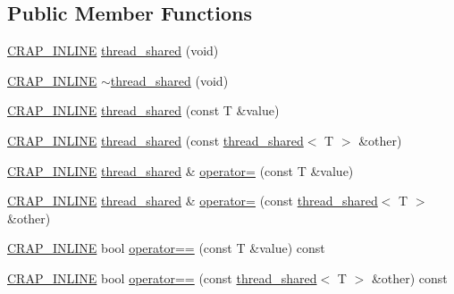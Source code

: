 \subsection*{Public Member Functions}
\begin{DoxyCompactItemize}
\item 
\hyperlink{config__x86_8h_a5a40526b8d842e7ff731509998bb0f1c}{C\+R\+A\+P\+\_\+\+I\+N\+L\+I\+N\+E} \hyperlink{structcrap_1_1thread__shared_a284be0c94546931a4f017d399c41b05e}{thread\+\_\+shared} (void)
\item 
\hyperlink{config__x86_8h_a5a40526b8d842e7ff731509998bb0f1c}{C\+R\+A\+P\+\_\+\+I\+N\+L\+I\+N\+E} \hyperlink{structcrap_1_1thread__shared_adb6c9ff7f1989bb5fca7ca2506e783a2}{$\sim$thread\+\_\+shared} (void)
\item 
\hyperlink{config__x86_8h_a5a40526b8d842e7ff731509998bb0f1c}{C\+R\+A\+P\+\_\+\+I\+N\+L\+I\+N\+E} \hyperlink{structcrap_1_1thread__shared_a6660e7195613db066a400beed9cdfcce}{thread\+\_\+shared} (const T \&value)
\item 
\hyperlink{config__x86_8h_a5a40526b8d842e7ff731509998bb0f1c}{C\+R\+A\+P\+\_\+\+I\+N\+L\+I\+N\+E} \hyperlink{structcrap_1_1thread__shared_abb672dc4870cd2948eebfad65c367a38}{thread\+\_\+shared} (const \hyperlink{structcrap_1_1thread__shared}{thread\+\_\+shared}$<$ T $>$ \&other)
\item 
\hyperlink{config__x86_8h_a5a40526b8d842e7ff731509998bb0f1c}{C\+R\+A\+P\+\_\+\+I\+N\+L\+I\+N\+E} \hyperlink{structcrap_1_1thread__shared}{thread\+\_\+shared} \& \hyperlink{structcrap_1_1thread__shared_a22094727610481a09f80ca5af0e0cfcf}{operator=} (const T \&value)
\item 
\hyperlink{config__x86_8h_a5a40526b8d842e7ff731509998bb0f1c}{C\+R\+A\+P\+\_\+\+I\+N\+L\+I\+N\+E} \hyperlink{structcrap_1_1thread__shared}{thread\+\_\+shared} \& \hyperlink{structcrap_1_1thread__shared_adbeedb35374eb8a000528557f5e2ea17}{operator=} (const \hyperlink{structcrap_1_1thread__shared}{thread\+\_\+shared}$<$ T $>$ \&other)
\item 
\hyperlink{config__x86_8h_a5a40526b8d842e7ff731509998bb0f1c}{C\+R\+A\+P\+\_\+\+I\+N\+L\+I\+N\+E} bool \hyperlink{structcrap_1_1thread__shared_a2991a6996c8e02447f391df8e55780d9}{operator==} (const T \&value) const 
\item 
\hyperlink{config__x86_8h_a5a40526b8d842e7ff731509998bb0f1c}{C\+R\+A\+P\+\_\+\+I\+N\+L\+I\+N\+E} bool \hyperlink{structcrap_1_1thread__shared_a058732a4daf318122536cdd40d6a849d}{operator==} (const \hyperlink{structcrap_1_1thread__shared}{thread\+\_\+shared}$<$ T $>$ \&other) const 

\end{DoxyCompactItemize}
